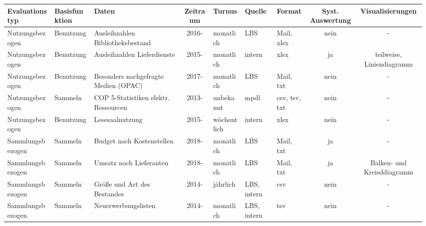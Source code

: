 \begin{table}[h]
    \centering
    \begin{adjustbox}{max width=\textwidth}
    \Huge
    \begin{tabular}{lllclllcc}
       \toprule
       \textbf{Evaluationstyp} &\textbf{Basisfunktion}               &\textbf{Daten}                                 &\textbf{Zeitraum} &\textbf{Turnus}    &\textbf{Quelle}  &\textbf{Format}          &\textbf{Syst. Auswertung} & \textbf{Visualisierungen}\\
       \midrule     
            Nutzungsbezogen         &Benutzung                      & Ausleihzahlen Bibliotheksbestand              & 2016-             & monatlich         & LBS          & Mail, xlsx                & nein  & -\\
            Nutzungsbezogen         &Benutzung                      & Ausleihzahlen Lieferdienste                   & 2015-             & monatlich         & intern       & xlsx                      & ja    & teilweise, Liniendiagramm\\ 
            Nutzungsbezogen         &Benutzung                      & Besonders nachgefragte Medien (OPAC)          & 2017-             & monatlich         & LBS          & Mail, txt                 & nein  & -\\ 
            Nutzungsbezogen         &Sammeln                       &\acrshort{COP 5}-Statistiken elektr. Ressourcen& 2013-            & unbekannt                 & mpdl         & csv, tsv, txt             & nein  & -\\ 
            Nutzungsbezogen         &Benutzung                      & Lesesaalnutzung                               & 2015-             & wöchentlich       & intern       & xlsx                      & nein  & -\\ 
            Sammlungsbezogen         &Sammeln                       & Budget nach Kostenstellen                   & 2018-               & monatlich         & LBS          & Mail, txt                 & ja    & -\\ 
            Sammlungsbezogen         &Sammeln                       & Umsatz nach Lieferanten                     & 2018-               & monatlich         & LBS          & Mail, txt                 & ja    & Balken- und Kreisddiagramm\\ 
            Sammlungsbezogen         &Sammeln                       & Größe und Art des Bestandes                   & 2014-             & jährlich          & LBS, intern  & csv                       & nein  & -\\ 
            Sammlungsbezogen         &Sammeln                       & Neuerwerbungslisten                           & 2014-             & monatlich         & LBS, intern  & tsv                       & nein  & -\\ 
            


\end{tabular}
\end{adjustbox}
\end{table}
